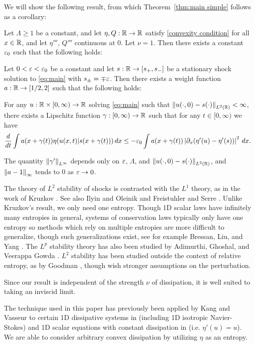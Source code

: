 We will show the following result, from which Theorem~\ref{thm:main simple} follows as a corollary:
\begin{theorem} \label{thm:main technical}
Let $\Lambda \geq 1$ be a constant, and let $\eta, Q: \mathbb{R} \to \mathbb{R}$ satisfy \eqref{convexity condition} for all $x \in \mathbb{R}$, and let $\eta'''$, $Q'''$ continuous at 0.  Let $\nu = 1$.  Then there exists a constant $\varepsilon_0$ such that the following holds:

Let $0 < \varepsilon < \varepsilon_0$ be a constant and let $s: \mathbb{R} \to [s_+,s_-]$ be a stationary shock solution to \eqref{eq:main} with $s_\pm = \mp \varepsilon$.  Then there exists a weight function $a:\mathbb{R} \to [1/2,2]$ such that the following holds:

For any $u:\mathbb{R}\times[0,\infty)\to\mathbb{R}$ solving \eqref{eq:main} such that $\left\lVert u(\cdot,0) - s(\cdot)\right\rVert_{L^2(\mathbb{R})} < \infty$, there exists a Lipschitz function $\gamma:[0,\infty) \to \mathbb{R}$ such that for any $t \in [0,\infty)$ we have
\[ \frac{d}{dt} \int a(x + \gamma(t)) \eta(u(x,t)|s(x+\gamma(t))) \,dx \leq -\varepsilon_0 \int a(x+\gamma(t)) \left\lvert \partial_x(\eta'(u)-\eta'(s)) \right\rvert^2 \,dx. \]

The quantity $\left\lVert\gamma'\right\rVert_{L^\infty}$ depends only on $\varepsilon$, $\Lambda$, and $\left\lVert u(\cdot,0) - s(\cdot)\right\rVert_{L^2(\mathbb{R})}$, and $\left\lVert a-1\right\rVert_\infty$ tends to 0 as $\varepsilon \to 0$.  
\end{theorem}

The theory of $L^2$ stability of shocks is contrasted with the $L^1$ theory, as in the work of Kruzkov \cite{Kr.entropy}.  See also Ilyin and Oleinik \cite{IlOl} and Freistuhler and Serre \cite{FrSe}.  Unlike Kruzkov's result, we only need one entropy.  Though 1D scalar laws have infinitely many entropies in general, systems of conservation laws typically only have one entropy so methods which rely on multiple entropies are more difficult to generalize, though such generalizations exist, see for example Bressan, Liu, and Yang \cite{BrLiYa}.  The $L^p$ stability theory has also been studied by Adimurthi, Ghoshal, and Veerappa Gowda \cite{AdGhVG}.  $L^2$ stability has been studied outside the context of relative entropy, as by Goodman \cite{Go}, though wish stronger assumptions on the perturbation.  

Since our result is independent of the strength $\nu$ of dissipation, it is well suited to taking an inviscid limit.  

The technique used in this paper has previously been applied by Kang and Vasseur to certain 1D dissipative systems in \cite{KaVa.navier} (including 1D isotropic Navier-Stokes) and 1D scalar equations with constant dissipation in \cite{Ka} (i.e. $\eta'(u)=u$).  We are able to consider arbitrary convex dissipation by utilizing $\eta$ as an entropy.  

